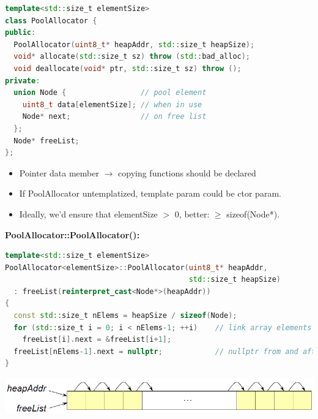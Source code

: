\begin{lstlisting}[language=C++]
template<std::size_t elementSize>
class PoolAllocator {
public:
  PoolAllocator(uint8_t* heapAddr, std::size_t heapSize);
  void* allocate(std::size_t sz) throw (std::bad_alloc);
  void deallocate(void* ptr, std::size_t sz) throw ();
private:
  union Node {                 // pool element
    uint8_t data[elementSize]; // when in use
    Node* next;                // on free list
  };
  Node* freeList;
};
\end{lstlisting}
\begin{itemize}
  \item Pointer data member $\rightarrow$ copying functions should be declared
  \item If PoolAllocator untemplatized, template param could be ctor param.
  \item Ideally, we'd ensure that elementSize $>$ 0, better: $\geq$ sizeof(Node*).
\end{itemize}

\textbf{PoolAllocator::PoolAllocator():}
\begin{lstlisting}[language=C++]
template<std::size_t elementSize>
PoolAllocator<elementSize>::PoolAllocator(uint8_t* heapAddr,
                                          std::size_t heapSize)
  : freeList(reinterpret_cast<Node*>(heapAddr))
{
  const std::size_t nElems = heapSize / sizeof(Node);
  for (std::size_t i = 0; i < nElems-1; ++i)    // link array elements
    freeList[i].next = &freeList[i+1];
  freeList[nElems-1].next = nullptr;            // nullptr from and after C++11
}
\end{lstlisting}
\includegraphics[width=0.7\linewidth]{images/AdvancedCPP/poolAllocatorConstructor}

